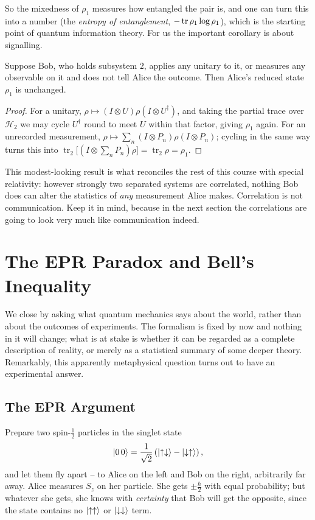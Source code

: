 \documentclass[a4paper]{scrartcl}
\newcommand{\half}{\tfrac{1}{2}}
\newcommand{\ptr}[1]{\operatorname{tr}_{#1}}
\begin{document}
So the mixedness of $\rho_1$ measures how entangled the pair is, and one can turn this into a number (the \emph{entropy of entanglement}, $-\tr\rho_1\log\rho_1$), which is the starting point of quantum information theory. For us the important corollary is about signalling.

\begin{proposition}[No Signalling]
    Suppose Bob, who holds subsystem $2$, applies any unitary to it, or measures any observable on it and does not tell Alice the outcome. Then Alice's reduced state $\rho_1$ is unchanged.
\end{proposition}
\begin{proof}
    For a unitary, $\rho \mapsto (I\otimes U)\rho(I\otimes U^\dagger)$, and taking the partial trace over $\mathcal{H}_2$ we may cycle $U^\dagger$ round to meet $U$ within that factor, giving $\rho_1$ again. For an unrecorded measurement, $\rho\mapsto\sum_n (I\otimes P_n)\rho(I\otimes P_n)$; cycling in the same way turns this into $\ptr{2}\big[(I\otimes \sum_n P_n)\rho\big] = \ptr{2}\rho = \rho_1$.
\end{proof}

This modest-looking result is what reconciles the rest of this course with special relativity: however strongly two separated systems are correlated, nothing Bob does can alter the statistics of \emph{any} measurement Alice makes. Correlation is not communication. Keep it in mind, because in the next section the correlations are going to look very much like communication indeed.

\section{The EPR Paradox and Bell's Inequality}\label{sec:epr}

We close by asking what quantum mechanics says about the world, rather than about the outcomes of experiments. The formalism is fixed by now and nothing in it will change; what is at stake is whether it can be regarded as a complete description of reality, or merely as a statistical summary of some deeper theory. Remarkably, this apparently metaphysical question turns out to have an experimental answer.

\subsection{The EPR Argument}

Prepare two spin-$\half$ particles in the singlet state
$$
\ket{0\,0} = \frac{1}{\sqrt2}\left( \ket{\uparrow\downarrow} - \ket{\downarrow\uparrow} \right),
$$
and let them fly apart -- to Alice on the left and Bob on the right, arbitrarily far away. Alice measures $S_z$ on her particle. She gets $\pm\frac\hbar2$ with equal probability; but whatever she gets, she knows with \emph{certainty} that Bob will get the opposite, since the state contains no $\ket{\uparrow\uparrow}$ or $\ket{\downarrow\downarrow}$ term.
\end{document}

